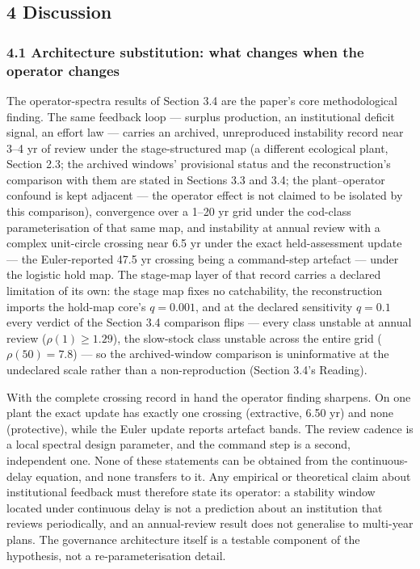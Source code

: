\documentclass[11pt]{article}
\begin{document}
\subsection{4 Discussion}\label{discussion}

\subsubsection{4.1 Architecture substitution: what changes when the
operator
changes}\label{architecture-substitution-what-changes-when-the-operator-changes}

The operator-spectra results of Section 3.4 are the paper's core
methodological finding. The same feedback loop --- surplus production,
an institutional deficit signal, an effort law --- carries an archived,
unreproduced instability record near 3--4 yr of review under the
stage-structured map (a different ecological plant, Section 2.3; the
archived windows' provisional status and the reconstruction's comparison
with them are stated in Sections 3.3 and 3.4; the plant--operator
confound is kept adjacent --- the operator effect is not claimed to be
isolated by this comparison), convergence over a 1--20 yr grid under the
cod-class parameterisation of that same map, and instability at annual
review with a complex unit-circle crossing near 6.5 yr under the exact
held-assessment update --- the Euler-reported 47.5 yr crossing being a
command-step artefact --- under the logistic hold map. The stage-map
layer of that record carries a declared limitation of its own: the stage
map fixes no catchability, the reconstruction imports the hold-map
core's \(q = 0.001\), and at the declared sensitivity \(q = 0.1\) every
verdict of the Section 3.4 comparison flips --- every class unstable at
annual review (\(\rho(1) \ge 1.29\)), the slow-stock class unstable
across the entire grid (\(\rho(50) = 7.8\)) --- so the archived-window
comparison is uninformative at the undeclared scale rather than a
non-reproduction (Section 3.4's Reading).

With the complete crossing record in hand the operator finding sharpens.
On one plant the exact update has exactly one crossing (extractive, 6.50
yr) and none (protective), while the Euler update reports artefact
bands. The review cadence is a local spectral design parameter, and the
command step is a second, independent one. None of these statements can
be obtained from the continuous-delay equation, and none transfers to
it. Any empirical or theoretical claim about institutional feedback must
therefore state its operator: a stability window located under
continuous delay is not a prediction about an institution that reviews
periodically, and an annual-review result does not generalise to
multi-year plans. The governance architecture itself is a testable
component of the hypothesis, not a re-parameterisation detail.
\end{document}
